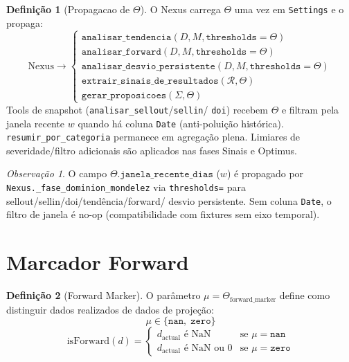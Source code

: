 \documentclass[a4paper, 12pt]{report}
\theoremstyle{definition}
\newtheorem{definicao}{Defini\c{c}\~ao}[chapter]
\theoremstyle{remark}
\newtheorem{observacao}{Observa\c{c}\~ao}[chapter]
\begin{document}
\begin{definicao}[Propagacao de $\Theta$]
  O Nexus carrega $\Theta$ uma vez em \texttt{Settings} e o propaga:
  \[
    \text{Nexus} \to
    \begin{cases}
      \texttt{analisar\_tendencia}(D, M, \texttt{thresholds}=\Theta) \\
      \texttt{analisar\_forward}(D, M, \texttt{thresholds}=\Theta) \\
      \texttt{analisar\_desvio\_persistente}(D, M, \texttt{thresholds}=\Theta) \\
      \texttt{extrair\_sinais\_de\_resultados}(\mathcal{R}, \Theta) \\
      \texttt{gerar\_proposicoes}(\Sigma, \Theta)
    \end{cases}
  \]
  Tools de snapshot (\texttt{analisar\_sellout}/\texttt{sellin}/
  \texttt{doi}) recebem $\Theta$ e filtram pela janela recente $w$
  quando h\'a coluna \texttt{Date} (anti-polui\c{c}\~ao hist\'orica).
  \texttt{resumir\_por\_categoria} permanece em agrega\c{c}\~ao plena.
  Limiares de severidade/filtro adicionais s\~ao aplicados nas fases
  Sinais e Optimus.
\end{definicao}

\begin{observacao}
  O campo $\Theta.\texttt{janela\_recente\_dias}$ ($w$) \'e propagado
  por \texttt{Nexus.\_fase\_dominion\_mondelez} via
  \texttt{thresholds=} para sellout/sellin/doi/tend\^encia/forward/
  desvio persistente. Sem coluna \texttt{Date}, o filtro de janela
  \'e no-op (compatibilidade com fixtures sem eixo temporal).
\end{observacao}


\section{Marcador Forward}

\begin{definicao}[Forward Marker]
  O par\^ametro $\mu = \Theta_{\text{forward\_marker}}$ define como
  distinguir dados realizados de dados de proje\c{c}\~ao:
  \[
    \mu \in \{\texttt{nan},\; \texttt{zero}\}
  \]
  \[
    \text{isForward}(d) = \begin{cases}
      d_{\text{actual}} \text{ \'e NaN} & \text{se } \mu = \texttt{nan} \\
      d_{\text{actual}} \text{ \'e NaN ou } 0 & \text{se } \mu = \texttt{zero}
    \end{cases}
  \]
\end{definicao}
\end{document}
